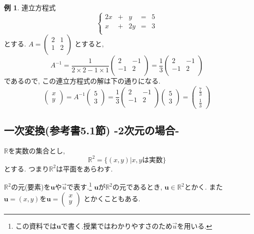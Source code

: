 \documentclass[dvipdfmx,a4paper,11pt]{article}
\newcommand{\R}{\mathbb{R}}
\theoremstyle{definition}
\newtheorem{exa}[thm]{例}
\begin{document}
 
   \begin{exa}
   連立方程式
$$
 \left\{ 
\begin{matrix}
2x&+&y&= &5\\
x&+&2y&= &3\\
\end{matrix}
\right.
$$
とする. 
$A=
  \begin{pmatrix}
 2& 1  \\
 1& 2  \\
 \end{pmatrix} 
 $
とすると, 
$$
A^{-1}
=
  \frac{1}{2\times 2-1 \times 1}
 \begin{pmatrix}
 2& -1  \\
 -1& 2  \\
 \end{pmatrix} 
 =
   \frac{1}{3}
 \begin{pmatrix}
 2& -1  \\
 -1& 2  \\
 \end{pmatrix} 
$$
であるので, この連立方程式の解は下の通りになる.
$$
 \begin{pmatrix}
 x \\
 y
 \end{pmatrix} 
 = A^{-1}
  \begin{pmatrix}
5 \\
 3
 \end{pmatrix} 
 =
   \frac{1}{3}
 \begin{pmatrix}
 2& -1  \\
 -1& 2  \\
 \end{pmatrix} 
  \begin{pmatrix}
5 \\
 3
 \end{pmatrix} 
 =
   \begin{pmatrix}
\frac{7}{3} \\
\frac{1}{3}
 \end{pmatrix} 
 $$


  \end{exa}
 

 \subsection{一次変換(参考書5.1節) -2次元の場合-}
 
$\R$を実数の集合とし, 
$$
\R^2  = \{ (x, y) | \text{$x,y$は実数}\} 
$$
とする. 
つまり$\R^2$は平面をあらわす.


$\R^2$の元(要素)を$\bm{u}$や$\overset{\to}{u}$で表す.\footnote{この資料では$\bm{u}$で書く.授業ではわかりやすさのため$\overset{\to}{u}$を用いる. }
$\bm{u}$が$\R^2$の元であるとき, $\bm{u} \in \R^2$とかく.
また$\bm{u} = (x, y)$を$\bm{u} =   
\begin{pmatrix}
x \\
 y
 \end{pmatrix} $
 とかくこともある. 
\end{document}
